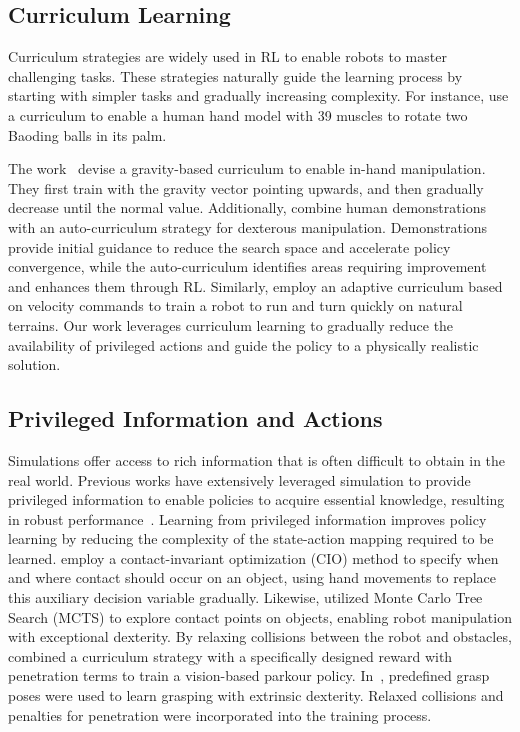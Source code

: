 \subsection{Curriculum Learning}
Curriculum strategies are widely used in RL to enable robots to master challenging tasks. These strategies naturally guide the learning process by starting with simpler tasks and gradually increasing complexity. For instance, \cite{CHIAPPA20243969} use a curriculum to enable a human hand model with 39 muscles to rotate two Baoding balls in its palm.

The work~\cite{chen2021system} devise a gravity-based curriculum to enable in-hand manipulation. They first train with the gravity vector pointing upwards, and then gradually decrease until the normal value. Additionally, \cite{bauza2024demostart} combine human demonstrations with an auto-curriculum strategy for dexterous manipulation. Demonstrations provide initial guidance to reduce the search space and accelerate policy convergence, while the auto-curriculum identifies areas requiring improvement and enhances them through RL. Similarly, \cite{margolis2024rapid} employ an adaptive curriculum based on velocity commands to train a robot to run and turn quickly on natural terrains. Our work leverages curriculum learning to gradually reduce the availability of privileged actions and guide the policy to a physically realistic solution. 

 








\subsection{Privileged Information and Actions}
Simulations offer access to rich information that is often difficult to obtain in the real world.
Previous works have extensively leveraged simulation to provide privileged information to enable policies to acquire essential knowledge, resulting in robust performance~\cite{lee2020learning, chen2023visual, qi2023general, yang2024anyrotate}. Learning from privileged information improves policy learning by reducing the complexity of the state-action mapping required to be learned.
\cite{mordatch2012contact} employ a contact-invariant optimization (CIO) method to specify when and where contact should occur on an object, using hand movements to replace this auxiliary decision variable gradually. Likewise, \cite{cheng2023enhancing} utilized Monte Carlo Tree Search (MCTS) to explore contact points on objects, enabling robot manipulation with exceptional dexterity. 
By relaxing collisions between the robot and obstacles, \cite{zhuang2023robot} combined a curriculum strategy with a specifically designed reward with penetration terms to train a vision-based parkour policy.
In~\cite{zhou2023learning}, predefined grasp poses were used to learn grasping with extrinsic dexterity. Relaxed collisions and penalties for penetration were incorporated into the training process.


